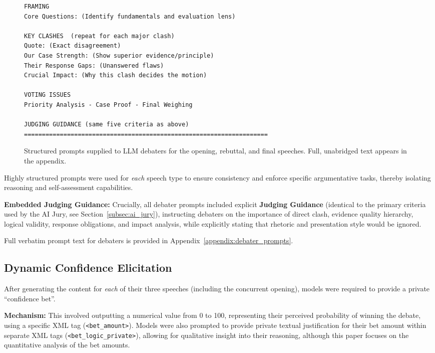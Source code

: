 \documentclass{article}
\begin{document}
\begin{figure}[htbp]
\begin{adjustbox}{max height=0.88\textheight}
\begin{lstlisting}[language={}]
FRAMING
Core Questions: (Identify fundamentals and evaluation lens)

KEY CLASHES  (repeat for each major clash)
Quote: (Exact disagreement)
Our Case Strength: (Show superior evidence/principle)
Their Response Gaps: (Unanswered flaws)
Crucial Impact: (Why this clash decides the motion)

VOTING ISSUES
Priority Analysis - Case Proof - Final Weighing

JUDGING GUIDANCE (same five criteria as above)
====================================================================
  \end{lstlisting}
  \end{adjustbox}

  \caption{Structured prompts supplied to LLM debaters for the opening, rebuttal,
  and final speeches.  Full, unabridged text appears in the appendix.}
  \label{fig:prompts}
\end{figure}


Highly structured prompts were used for \textit{each} speech type to ensure consistency and enforce specific argumentative tasks, thereby isolating reasoning and self-assessment capabilities.

\textbf{Embedded Judging Guidance:} Crucially, all debater prompts included explicit \textbf{Judging Guidance} (identical to the primary criteria used by the AI Jury, see Section~\ref{subsec:ai_jury}), instructing debaters on the importance of direct clash, evidence quality hierarchy, logical validity, response obligations, and impact analysis, while explicitly stating that rhetoric and presentation style would be ignored.

Full verbatim prompt text for debaters is provided in Appendix~\ref{appendix:debater_prompts}.

\subsection{Dynamic Confidence Elicitation}
\label{subsec:confidence_elicitation}

After generating the content for \textit{each} of their three speeches (including the concurrent opening), models were required to provide a private ``confidence bet''.

\textbf{Mechanism:} This involved outputting a numerical value from 0 to 100, representing their perceived probability of winning the debate, using a specific XML tag (\texttt{\textless bet\_amount\textgreater}).
Models were also prompted to provide private textual justification for their bet amount within separate XML tags (\texttt{\textless bet\_logic\_private\textgreater}), allowing for qualitative insight into their reasoning, although this paper focuses on the quantitative analysis of the bet amounts.
\end{document}
